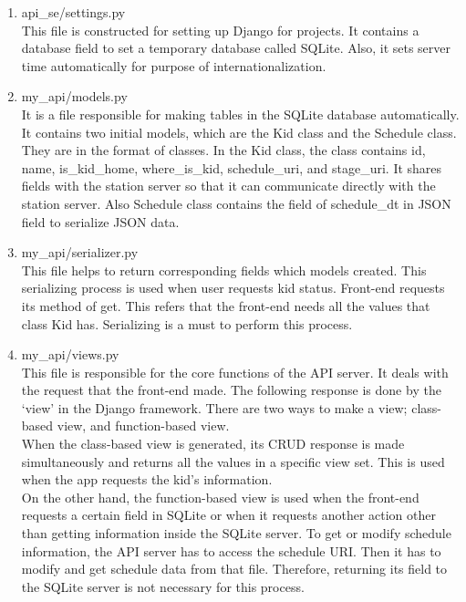 \documentclass[conference]{IEEEtran}
\begin{document}
\begin{enumerate}[label=\arabic*.]
\begin{enumerate}[label=\arabic*.]
\begin{enumerate}[label=\alph*.]
\begin{enumerate}[label=\roman*.]
            \item{\large{api\_se/settings.py}}\\
            This file is constructed for setting up Django for projects. It contains a database field to set a temporary database called SQLite. Also, it sets server time automatically for purpose of internationalization. \\
            \item{\large{my\_api/models.py}}\\
            It is a file responsible for making tables in the SQLite database automatically. It contains two initial models, which are the Kid class and the Schedule class. They are in the format of classes. In the Kid class, the class contains id, name, is\_kid\_home, where\_is\_kid, schedule\_uri, and stage\_uri. It shares fields with the station server so that it can communicate directly with the station server. Also Schedule class contains the field of schedule\_dt in JSON field to serialize JSON data. \\
            \item{\large{my\_api/serializer.py}}\\
            This file helps to return corresponding fields which models created. This serializing process is used when user requests kid status. Front-end requests its method of get. This refers that the front-end needs all the values that class Kid has. Serializing is a must to perform this process. \\ 
            \item{\large{my\_api/views.py}}\\
            This file is responsible for the core functions of the API server. It deals with the request that the front-end made. The following response is done by the ‘view’ in the Django framework. There are two ways to make a view; class-based view, and function-based view. \\
            When the class-based view is generated, its CRUD response is made simultaneously and returns all the values in a specific view set. This is used when the app requests the kid's information. \\
            On the other hand, the function-based view is used when the front-end requests a certain field in SQLite or when it requests another action other than getting information inside the SQLite server. To get or modify schedule information, the API server has to access the schedule URI. Then it has to modify and get schedule data from that file. Therefore, returning its field to the SQLite server is not necessary for this process. \\

\end{enumerate}
\end{enumerate}
\end{enumerate}
\end{enumerate}
\end{document}
